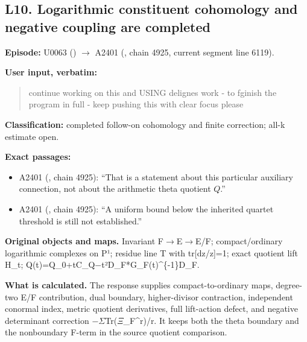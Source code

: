 \documentclass[10pt,a4paper,oneside]{report}
\providecommand{\tightlist}{\setlength{\itemsep}{0pt}\setlength{\parskip}{0pt}}
\begin{document}
\subsection{L10. Logarithmic constituent cohomology and negative
coupling are
completed}\label{l10.-logarithmic-constituent-cohomology-and-negative-coupling-are-completed}

\textbf{Episode:} U0063
(\protect{})
\allowbreak{}\ensuremath{→}\allowbreak{} A2401
(\protect{}, chain 4925,
current segment line 6119).

\textbf{User input, verbatim:}

\begin{quote}
continue working on this and USING delignes work - to fginish the
program in full - keep pushing this with clear focus please
\end{quote}

\textbf{Classification:} completed follow-on cohomology and finite
correction; all-k estimate open.

\textbf{Exact passages:}

\begin{itemize}
\tightlist
\item
  A2401 (\protect{}, chain
  4925): ``That is a statement about this particular auxiliary
  connection, not about the arithmetic theta quotient \(Q\).''
\item
  A2401 (\protect{}, chain
  4925): ``A uniform bound below the inherited quartet threshold is
  still not established.''
\end{itemize}

\textbf{Original objects and maps.} Invariant
F\allowbreak{}\ensuremath{→}\allowbreak{}E\allowbreak{}\ensuremath{→}\allowbreak{}E/F;
compact/ordinary logarithmic complexes on P¹; residue line T with
tr{[}dz/z{]}=1; exact quotient lift H\_t;
Q(t)=Q\_0+tC\_Q\allowbreak{}\ensuremath{−}\allowbreak{}t²D\_F*G\_F(t)\textasciicircum{}\{-1\}D\_F.

\textbf{What is calculated.} The response supplies compact-to-ordinary
maps, degree-two E/F contribution, dual boundary, higher-divisor
contraction, independent conormal index, metric quotient derivatives,
full lift-action defect, and negative determinant correction
\allowbreak{}\ensuremath{−}\allowbreak{}\allowbreak{}\ensuremath{Σ}\allowbreak{}Tr(\allowbreak{}\ensuremath{Ξ}\allowbreak{}\_F\textasciicircum{}r)/r.
It keeps both the theta boundary and the nonboundary F-term in the
source quotient comparison.
\end{document}
